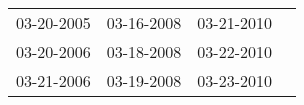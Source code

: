 \begin{supertabular}{llll}
 03-20-2005 &  03-16-2008 &  03-21-2010 \\
 03-20-2006 &  03-18-2008 &  03-22-2010 \\
 03-21-2006 &  03-19-2008 &  03-23-2010 \\
\end{supertabular}
